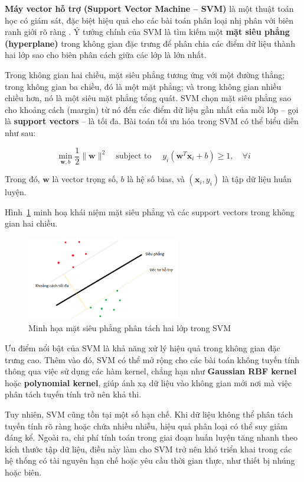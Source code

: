\textbf{Máy vector hỗ trợ (Support Vector Machine – SVM)} là một thuật 
toán học có giám sát, đặc biệt hiệu quả cho các bài toán phân loại nhị 
phân với biên ranh giới rõ ràng \cite{cortes1995svm}. Ý tưởng chính của SVM là tìm kiếm một 
\textbf{mặt siêu phẳng (hyperplane)} trong không gian đặc trưng để phân 
chia các điểm dữ liệu thành hai lớp sao cho biên phân cách giữa các lớp 
là lớn nhất.

Trong không gian hai chiều, mặt siêu phẳng tương ứng với một đường thẳng; 
trong không gian ba chiều, đó là một mặt phẳng; và trong không gian 
nhiều chiều hơn, nó là một siêu mặt phẳng tổng quát. 
SVM chọn mặt siêu phẳng sao cho khoảng cách (margin) từ nó đến các 
điểm dữ liệu gần nhất của mỗi lớp – gọi là \textbf{support vectors} – 
là tối đa. Bài toán tối ưu hóa trong SVM có thể biểu diễn như sau:

\begin{equation}
\min_{\mathbf{w}, b} \frac{1}{2} \|\mathbf{w}\|^2 \quad 
\text{subject to } \quad y_i(\mathbf{w}^T \mathbf{x}_i + b) \geq 1, \quad \forall i
\end{equation}

Trong đó, $\mathbf{w}$ là vector trọng số, $b$ là hệ số bias, và $(\mathbf{x}_i, y_i)$ là tập dữ liệu huấn luyện.

Hình~\ref{svm} minh hoạ khái niệm mặt siêu phẳng và các support vectors trong không gian hai chiều.

\begin{figure}[htbp]
    \centering
    \includegraphics[width=0.6\textwidth]{images/svm.png}
    \caption{Minh họa mặt siêu phẳng phân tách hai lớp trong SVM}
    \label{svm}
\end{figure}
Ưu điểm nổi bật của SVM là khả năng xử lý hiệu quả trong không gian 
đặc trưng cao. Thêm vào đó, SVM có thể mở rộng cho các bài toán 
không tuyến tính thông qua việc sử dụng các hàm kernel, chẳng hạn như 
\textbf{Gaussian RBF kernel} hoặc \textbf{polynomial kernel}, 
giúp ánh xạ dữ liệu vào không gian mới nơi mà việc phân tách tuyến tính 
trở nên khả thi.

Tuy nhiên, SVM cũng tồn tại một số hạn chế. Khi dữ liệu không thể 
phân tách tuyến tính rõ ràng hoặc chứa nhiều nhiễu, hiệu quả phân loại 
có thể suy giảm đáng kể. Ngoài ra, chi phí tính toán trong giai 
đoạn huấn luyện tăng nhanh theo kích thước tập dữ liệu, điều này làm 
cho SVM trở nên khó triển khai trong các hệ thống có tài nguyên hạn 
chế hoặc yêu cầu thời gian thực, như thiết bị nhúng hoặc biên.

